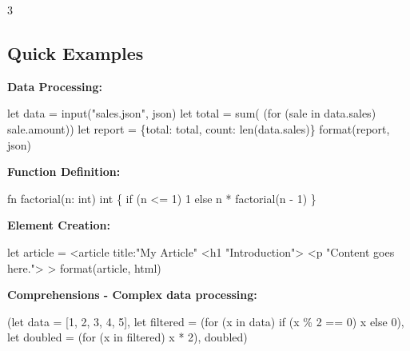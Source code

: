 \documentclass[8pt,landscape,a4paper,oneside]{article}
\newenvironment{Shaded}{%
  \begin{snugshade}%
  \vspace{0.4\baselineskip}%
  \fontsize{9}{10}\selectfont%
  \setlength{\parskip}{0pt}%
  \setlength{\topsep}{0pt}%
  \setlength{\partopsep}{0pt}%
}{%
  \vspace{0.01\baselineskip}%
  \end{snugshade}%
}
\newcommand{\NormalTok}[1]{#1}
\begin{document}
\begin{multicols*}{3}
\subsection{Quick Examples}\label{quick-examples}

\textbf{Data Processing:}

\begin{Shaded}
\begin{Highlighting}[]
\NormalTok{let data = input("sales.json", \textquotesingle{}json\textquotesingle{})}
\NormalTok{let total = sum(}
\NormalTok{  (for (sale in data.sales) sale.amount))}
\NormalTok{let report = \{total: total,}
\NormalTok{  count: len(data.sales)\}}
\NormalTok{format(report, \textquotesingle{}json\textquotesingle{})}
\end{Highlighting}
\end{Shaded}

\textbf{Function Definition:}

\begin{Shaded}
\begin{Highlighting}[]
\NormalTok{fn factorial(n: int) int \{}
\NormalTok{    if (n \textless{}= 1) 1 else n * factorial(n {-} 1)}
\NormalTok{\}}
\end{Highlighting}
\end{Shaded}

\textbf{Element Creation:}

\begin{Shaded}
\begin{Highlighting}[]
\NormalTok{let article = \textless{}article title:"My Article"}
\NormalTok{    \textless{}h1 "Introduction"\textgreater{}}
\NormalTok{    \textless{}p "Content goes here."\textgreater{}}
\NormalTok{\textgreater{}}
\NormalTok{format(article, \textquotesingle{}html\textquotesingle{})}
\end{Highlighting}
\end{Shaded}

\textbf{Comprehensions - Complex data processing:}

\begin{Shaded}
\begin{Highlighting}[]
\NormalTok{(let data = [1, 2, 3, 4, 5],}
\NormalTok{ let filtered = (for (x in data)}
\NormalTok{   if (x \% 2 == 0) x else 0),}
\NormalTok{ let doubled = (for (x in filtered) x * 2), doubled)}
\end{Highlighting}
\end{Shaded}

\end{multicols*}
\end{document}
